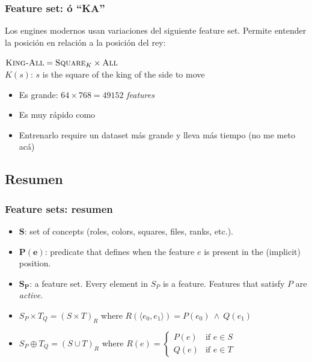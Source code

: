 \begin{frame}
\frametitle{Feature set:  ó \enquote{KA}}
Los engines modernos usan variaciones del siguiente feature set. Permite entender la posición en relación a la posición del rey:
\begin{center}
    $\textsc{King-All} = \textsc{Square}_{K} \times \textsc{All}$ \\
    $K(s)$: $s$ is the square of the king of the side to move\\
\end{center}
\begin{itemize}
    \item<2-> Es grande: $64 \times 768 = 49152$ \textit{features}
    \item<3-> Es muy rápido como 
    \item<4-> Entrenarlo require un dataset más grande y lleva más tiempo (no me meto acá)
\end{itemize}
\end{frame}

\subsection{Resumen}

\begin{frame}
\frametitle{Feature sets: resumen}
\begin{itemize}
\item $\bm S$: set of concepts (roles, colors, squares, files, ranks, etc.).
\item $\bm{P(e)}$: predicate that defines when the feature $e$ is present in the (implicit) position.
\item ${\bm S}_{\bm P}$: a feature set. Every element in $S_P$ is a feature. Features that satisfy $P$ are \textit{active}.
\item $S_P \times T_Q={(S \times T)}_{R}$ where $R(\langle e_0, e_1 \rangle) = P(e_0)\ \land\ Q(e_1)$
\item $S_P \oplus T_Q={(S \cup T)}_R$ where $R(e) = \begin{cases}
        P(e) & \text{if } e \in S \\
        Q(e) & \text{if } e \in T
    \end{cases}
$
\end{itemize}
\end{frame}
